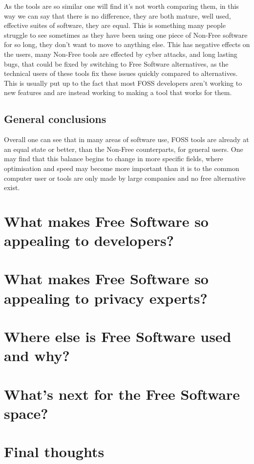 \documentclass[a4paper,12pt]{article}
\begin{document}
{As the tools are so similar one will find it's not worth comparing them, in this way we can say that there is no
difference, they are both mature, well used, effective suites of software, they are equal. This is something many
people struggle to see sometimes as they have been using one piece of Non-Free software for so long, they don't
want to move to anything else.	This has negative effects on the users, many Non-Free tools are effected by cyber
attacks, and long lasting bugs, that could be fixed by switching to Free Software alternatives, as the technical
users of these tools fix these issues quickly compared to alternatives. This is usually put up to the fact that
most FOSS developers aren't working to new features and are instead working to making a tool that works for them.

\subsection{General conclusions} 
Overall one can see that in many areas of software use, FOSS tools are already
at an equal state or better, than the Non-Free counterparts, for general users. One may find that this balance
begins to change in more specific fields, where optimisation and speed may become more important than it is to
the common computer user or tools are only made by large companies and no free alternative exist.

\section{What makes Free Software so appealing to developers?} 
\section{What makes Free Software so appealing to privacy experts?} 
\section{Where else is Free Software used and why?} 
\section{What's next for the Free Software space?} 
\section{Final thoughts}

\newpage 
\printbibliography 
} 
\end{document}
